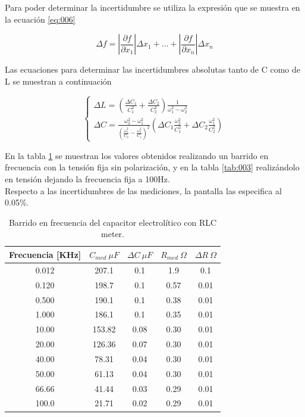 \documentclass[a4paper,10pt]{article}
\begin{document}
		\indent Para poder determinar la incertidumbre se utiliza la expresión 
		que se muestra en la ecuación \ref{eq:006}

		\begin{equation}\label{eq:006}
			\Delta f = 	|\frac{\partial f}{\partial x_1}|\Delta x_1 + ... + 
						|\frac{\partial f}{\partial x_n}|\Delta x_n
		\end{equation}

		\indent Las ecuaciones para determinar las incertidumbres absolutas 
		tanto de C como de L se muestran a continuación

		\begin{equation}\label{eq:007}
			\begin{cases}
			\Delta L = (\frac{\Delta C_1}{C_1^2} + \frac{\Delta C_2}{C_2^2}) 
						\frac{1}{\omega_1^2 - \omega_2^2} \\ 
			\Delta C =  \frac{\omega_2^2 - \omega_1^2}{(\frac{\omega_1^2}{C_2} -
						\frac{\omega_2^2}{C_1})^2}(\Delta C_1\frac{\omega_2^2}
						{C_1^2} + \Delta C_2 \frac{\omega_1^2}{C_2^2})
			\end{cases}
		\end{equation}

		\indent En la tabla \ref{tab:002} se muestran los valores obtenidos 
		realizando un barrido en frecuencia con la tensión fija sin 
		polarización, y en la tabla \ref{tab:003} realizándolo en tensión 
		dejando la frecuencia fija a 100Hz. \\
		\indent Respecto a las incertidumbres de las mediciones, la pantalla las
		especifica al 0.05\%. 

		\begin{table}[!htp]
			\centering
			\begin{tabular}{|c|c|c|c|c|}
				\hline
				Frecuencia [KHz] & $C_{med}~\mu F$ & $\Delta C~\mu F$ & 
				$R_{med}~\Omega$ & $\Delta R~\Omega$ \\
				\hline
				0.012 &	207.1 & 0.1 & 1.9 & 0.1 \\
				\hline
				0.120 &	198.7 & 0.1 & 0.57 & 0.01 \\
				\hline
				0.500 &	190.1 & 0.1 & 0.38 & 0.01 \\
				\hline
				1.000 &	186.1 & 0.1 & 0.35 & 0.01 \\
				\hline
				10.00 &	153.82 & 0.08 & 0.30 & 0.01 \\
				\hline
				20.00 &	126.36 & 0.07 & 0.30 & 0.01 \\   
				\hline
				40.00 &	78.31 & 0.04 & 0.30 & 0.01 \\
				\hline
				50.00 &	61.13 & 0.04 & 0.30 & 0.01 \\
				\hline
				66.66 &	41.44 & 0.03 & 0.29 & 0.01 \\
				\hline
				100.0 &	21.71 & 0.02 & 0.29 & 0.01 \\
				\hline	  
			\end{tabular}
			\caption{Barrido en frecuencia del capacitor electrolítico con RLC 
			meter.} 
			\label{tab:002}
		\end{table}	
		
\end{document}
